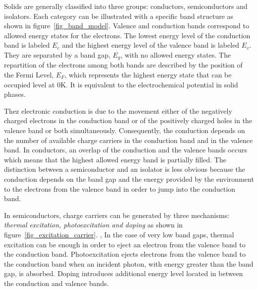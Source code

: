     Solids are generally classified into three groups: 
    conductors, semiconductors and isolators. 
    Each category can be illustrated with a specific band structure as shown in 
    figure~\ref{fig_band_model}. 
    Valence and conduction bands correspond to allowed energy states for the electrons. 
    The lowest energy level of the conduction band is labeled $E_c$ and the 
    highest energy level of the valence band is labeled $E_v$. 
    They are separated by a band gap, $E_g$, with no allowed energy states. 
    The repartition of the electrons among both bands are described by the position 
    of the Fermi Level, $E_F$, which represents the highest energy state that 
    can be occupied level at 0K. 
    It is equivalent to the electrochemical potential in solid phases.

    

    Thez electronic conduction is due to the movement either of the negatively 
    charged electrons in the conduction band or of the positively charged holes 
    in the valence band or both simultaneously. 
    Consequently, the conduction depends on the number of available charge carriers
    in the conduction band and in the valence band. 
    In conductors, an overlap of the conduction and the valence bands occurs 
    which means that the highest allowed energy band is partially filled. 
    The distinction between a semiconductor and an isolator is less obvious 
    because the conduction depends on the band gap and the energy provided by 
    the environment to the electrons from the valence band in order to jump 
    into the conduction band.

    In semiconductors, charge carriers can be generated by three mechanisms: 
    \emph{thermal excitation, photoexcitation and doping} as shown in 
    figure~\ref{fig_excitation_carrier}.  , 
    In the case of very low band gaps, thermal excitation can be enough in order 
    to eject an electron from the valence band to the conduction band. 
    Photoexcitation ejects electrons from the valence band to the conduction 
    band when an incident photon, with energy greater than the band gap, is absorbed. 
    Doping introduces additional energy level located in between the conduction and 
    valence bands.

